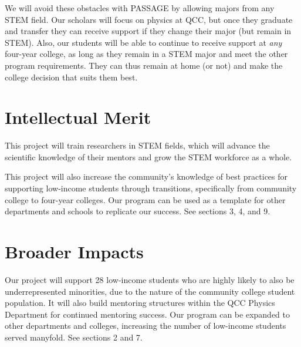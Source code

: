 \documentclass[12pt]{article}
\newcommand\new[1]{{\color{blue}#1}}
\begin{document}
We will avoid these obstacles with PASSAGE by allowing majors from any STEM field.  Our scholars will focus on physics at QCC, but once they graduate and transfer they can receive support if they change their major (but remain in STEM).  Also, our students will be able to continue to receive support at {\em any} four-year college, as long as they remain in a STEM major and meet the other program requirements.  They can thus remain at home (or not) and make the college decision that suits them best.



\vspace{-5mm}

\section{Intellectual Merit}
This project will train researchers in STEM fields, which will advance the scientific knowledge of their mentors and grow the STEM workforce as a whole.

This project will also increase the community's knowledge of best practices for supporting low-income students through transitions, specifically from community college to four-year colleges.  Our program can be used as a template for other departments and schools to replicate our success.  See sections 3, 4, and 9.


\vspace{-3mm}

\section{Broader Impacts}

Our project will support 28 low-income students who are highly likely to also be underrepresented minorities, due to the nature of the community college student population.  It will also build mentoring structures within the QCC Physics Department for continued mentoring success.  Our program can be expanded to other departments and colleges, increasing the number of low-income students served manyfold.  See sections 2 and 7.

\newpage

\end{document}
